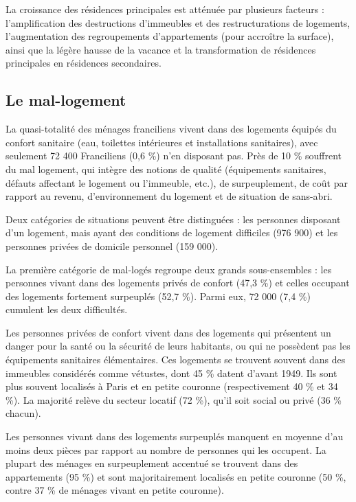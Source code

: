 \documentclass[a4paper, 12pt]{report}
\begin{document}
La croissance des résidences principales est atténuée par plusieurs facteurs : l’amplification des destructions d’immeubles et des restructurations de logements, l’augmentation des regroupements d’appartements (pour accroître la surface), ainsi que la légère hausse de la vacance et la transformation de résidences principales en résidences secondaires.

\subsection{Le mal-logement}

La quasi-totalité des ménages franciliens vivent dans des logements équipés du confort sanitaire (eau, toilettes intérieures et installations sanitaires), avec seulement 72 400 Franciliens (0,6 \%) n’en disposant pas. Près de 10 \% souffrent du mal logement, qui intègre des notions de qualité (équipements sanitaires, défauts affectant le logement ou l’immeuble, etc.), de surpeuplement, de coût par rapport au revenu, d’environnement du logement et de situation de sans-abri.

Deux catégories de situations peuvent être distinguées : les personnes disposant d’un logement, mais ayant des conditions de logement difficiles (976 900) et les personnes privées de domicile personnel (159 000).

La première catégorie de mal-logés regroupe deux grands sous-ensembles : les personnes vivant dans des logements privés de confort (47,3 \%) et celles occupant des logements fortement surpeuplés (52,7 \%). Parmi eux, 72 000 (7,4 \%) cumulent les deux difficultés.

Les personnes privées de confort vivent dans des logements qui présentent un danger pour la santé ou la sécurité de leurs habitants, ou qui ne possèdent pas les équipements sanitaires élémentaires. Ces logements se trouvent souvent dans des immeubles considérés comme vétustes, dont 45 \% datent d’avant 1949. Ils sont plus souvent localisés à Paris et en petite couronne (respectivement 40 \% et 34 \%). La majorité relève du secteur locatif (72 \%), qu’il soit social ou privé (36 \% chacun).

Les personnes vivant dans des logements surpeuplés manquent en moyenne d'au moins deux pièces par rapport au nombre de personnes qui les occupent. La plupart des ménages en surpeuplement accentué se trouvent dans des appartements (95 \%) et sont majoritairement localisés en petite couronne (50 \%, contre 37 \% de ménages vivant en petite couronne). 
\end{document}
